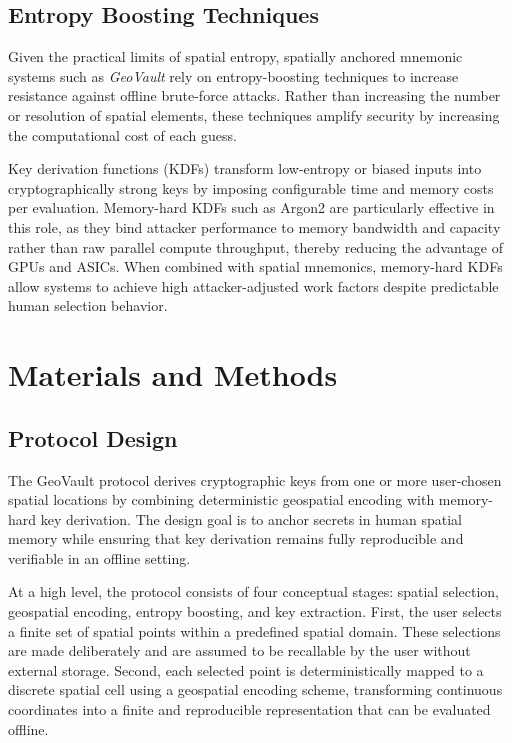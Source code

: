 \documentclass[mathematics,article,accept,pdftex,moreauthors]{Definitions/mdpi}
\begin{document}
\subsection{Entropy Boosting Techniques}

Given the practical limits of spatial entropy, spatially anchored mnemonic systems such as \textit{GeoVault} rely on entropy-boosting techniques to increase resistance against offline brute-force attacks. Rather than increasing the number or resolution of spatial elements, these techniques amplify security by increasing the computational cost of each guess.

Key derivation functions (KDFs) transform low-entropy or biased inputs into cryptographically strong keys by imposing configurable time and memory costs per evaluation. Memory-hard KDFs such as Argon2 are particularly effective in this role, as they bind attacker performance to memory bandwidth and capacity rather than raw parallel compute throughput, thereby reducing the advantage of GPUs and ASICs. When combined with spatial mnemonics, memory-hard KDFs allow systems to achieve high attacker-adjusted work factors despite predictable human selection behavior.


\section{Materials and Methods\label{sec4}}

\subsection{Protocol Design\label{sec4.1}}

The GeoVault protocol derives cryptographic keys from one or more user-chosen spatial locations by combining deterministic geospatial encoding with memory-hard key derivation. The design goal is to anchor secrets in human spatial memory while ensuring that key derivation remains fully reproducible and verifiable in an offline setting.

At a high level, the protocol consists of four conceptual stages: spatial selection, geospatial encoding, entropy boosting, and key extraction. First, the user selects a finite set of spatial points within a predefined spatial domain. These selections are made deliberately and are assumed to be recallable by the user without external storage. Second, each selected point is deterministically mapped to a discrete spatial cell using a geospatial encoding scheme, transforming continuous coordinates into a finite and reproducible representation that can be evaluated offline.
\end{document}
